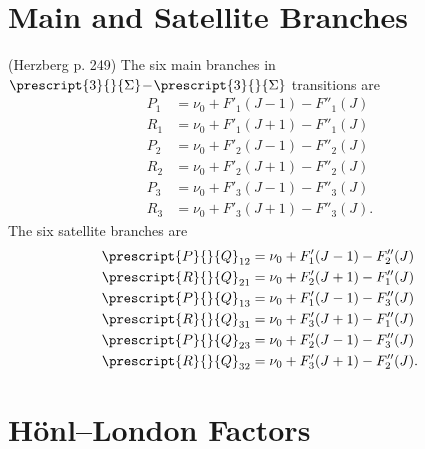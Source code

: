 \documentclass[11pt, twoside, fleqn]{report}
\newcommand{\dash}{\!-\!}
\newcommand{\state}[2]{\prescript{#1}{}{#2}}
\begin{document}
    \section{Main and Satellite Branches}

    (Herzberg p. 249) The six main branches in $\state{3}{\Sigma}\dash\state{3}{\Sigma}$ transitions are
    \begin{align*}
        P_1 & = \nu_0 + F'_1(J - 1) - F''_1(J)  \\
        R_1 & = \nu_0 + F'_1(J + 1) - F''_1(J)  \\
        P_2 & = \nu_0 + F'_2(J - 1) - F''_2(J)  \\
        R_2 & = \nu_0 + F'_2(J + 1) - F''_2(J)  \\
        P_3 & = \nu_0 + F'_3(J - 1) - F''_3(J)  \\
        R_3 & = \nu_0 + F'_3(J + 1) - F''_3(J).
    \end{align*}
    The six satellite branches are
    \begin{align*}
        \state{P}{Q}_{12} & = \nu_0 + F'_1(J - 1) - F''_2(J)  \\
        \state{R}{Q}_{21} & = \nu_0 + F'_2(J + 1) - F''_1(J)  \\
        \state{P}{Q}_{13} & = \nu_0 + F'_1(J - 1) - F''_3(J)  \\
        \state{R}{Q}_{31} & = \nu_0 + F'_3(J + 1) - F''_1(J)  \\
        \state{P}{Q}_{23} & = \nu_0 + F'_2(J - 1) - F''_3(J)  \\
        \state{R}{Q}_{32} & = \nu_0 + F'_3(J + 1) - F''_2(J).
    \end{align*}

    \section{H\"onl--London Factors}
\end{document}
